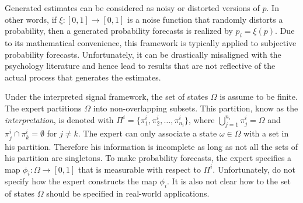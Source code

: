 \documentclass[11pt,twoside]{article}
\begin{document}
Generated estimates can be considered as noisy or distorted versions of $p$. In other words, if $\xi: [0,1] \to [0,1]$ is a noise function that randomly distorts a probability, then a generated probability forecasts is realized by $p_i = \xi(p)$. Due to its mathematical convenience, this framework is typically applied to subjective probability forecasts. Unfortunately, it can be drastically misaligned with the psychology literature and hence lead to results that are not reflective of the actual process that generates the estimates.

Under the interpreted signal framework, the set of states $\Omega$ is assume to be finite. The expert partitions $\Omega$ into non-overlapping subsets. This partition, know as the \textit{interpretation}, is denoted with $\Pi^i = \{\pi_1^i, \pi_2^i, \dots, \pi_{n_i}^i\}$, where $\bigcup_{j=1}^{n_i} \pi_j^i = \Omega$ and  $\pi_j^i \cap \pi_k^i = \emptyset$ for $j \neq k$. The expert can only associate a state $\omega \in \Omega$ with a set in his partition. Therefore his information is incomplete as long as not all the sets of his partition are singletons. To make probability forecasts, the expert specifies a map $\phi_i: \Omega \to [0, 1]$ that is measurable with respect to $\Pi^i$. 
Unfortunately, \cite{hong2009interpreted} do not specify how the expert constructs the map $\phi_i$. It is also not clear how to the set of states $\Omega$ should be specified in real-world applications.  
\end{document}
